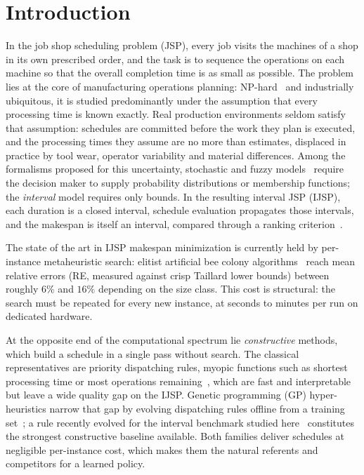 \documentclass[preprint,authoryear,12pt]{elsarticle}
\theoremstyle{definition}
\theoremstyle{remark}
\begin{document}
\section{Introduction}
\label{sec:intro}

In the job shop scheduling problem (JSP), every job visits the
machines of a shop in its own prescribed order, and the task is to
sequence the operations on each machine so that the overall
completion time is as small as possible. The
problem lies at the core of manufacturing operations planning:
NP-hard~\citep{GareyJohnson1976}
and industrially ubiquitous, it is studied predominantly under the
assumption that every processing time is known exactly. Real
production environments seldom satisfy that assumption: schedules are
committed before the work they plan is executed, and the processing
times they assume are no more than estimates, displaced in practice
by tool wear, operator variability and material differences. Among
the formalisms proposed for this uncertainty, stochastic and fuzzy
models~\citep{GonzalezRodriguez2010} require the decision maker to
supply probability distributions or membership functions; the
\emph{interval} model requires only bounds. In the resulting
interval JSP (IJSP), each duration is a closed interval, schedule
evaluation propagates those intervals, and the makespan is itself an
interval, compared through a ranking criterion~\citep{Lei2011,
DiazICAE2023}.

The state of the art in IJSP makespan minimization is currently
held by per-instance metaheuristic search: elitist artificial bee colony
algorithms~\citep{DiazFEABC2023,DiazICAE2023} reach mean relative
errors (RE, measured against crisp Taillard lower bounds) between
roughly $6\%$ and $16\%$ depending on the size class. This cost is structural: the search must
be repeated for every new instance, at seconds to minutes per run on
dedicated hardware.

At the opposite end of the computational spectrum lie
\emph{constructive} methods, which build a schedule in a single pass
without search. The classical representatives are priority dispatching
rules, myopic functions such as shortest processing time or most
operations remaining~\citep{Panwalkar1977,Haupt1989}, which are fast
and interpretable but leave a wide quality gap on the IJSP. Genetic
programming (GP) hyper-heuristics narrow that gap by evolving
dispatching rules offline from a training
set~\citep{Branke2016,Nguyen2017}; a rule recently evolved for the
interval benchmark studied here~\citep{DiazGP2026} constitutes the
strongest constructive baseline available. Both families deliver
schedules at negligible per-instance cost, which makes them the
natural referents and competitors for a learned policy.
\end{document}
